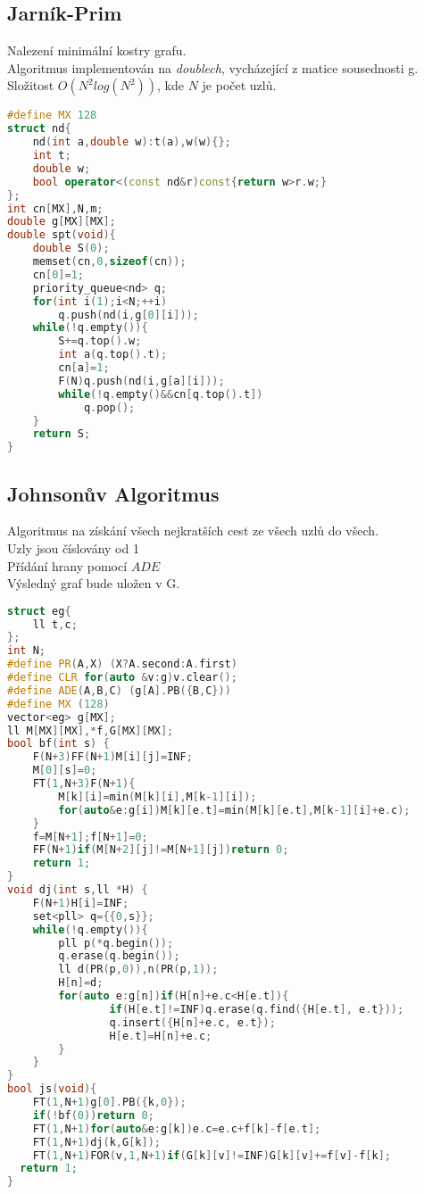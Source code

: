 \documentclass[11pt]{article}
\begin{document}
\subsection{Jarník-Prim}
Nalezení minimální kostry grafu.
\\Algoritmus implementován na \textit{doublech}, vycházející z matice sousednosti \textsf{g}.
\\Složitost $O(N^2log(N^2))$, kde $N$ je počet uzlů.
\begin{lstlisting}[language=C++]
#define MX 128
struct nd{
    nd(int a,double w):t(a),w(w){};
    int t;
    double w;
    bool operator<(const nd&r)const{return w>r.w;}
};
int cn[MX],N,m;
double g[MX][MX];
double spt(void){
    double S(0);
    memset(cn,0,sizeof(cn));
    cn[0]=1;
    priority_queue<nd> q;
    for(int i(1);i<N;++i)
        q.push(nd(i,g[0][i]));
    while(!q.empty()){
        S+=q.top().w;
        int a(q.top().t);
        cn[a]=1;
        F(N)q.push(nd(i,g[a][i]));
        while(!q.empty()&&cn[q.top().t])
            q.pop();
    }
    return S;
}
\end{lstlisting}
\subsection{Johnsonův Algoritmus}
Algoritmus na získání všech nejkratších cest ze všech uzlů do všech.
\\Uzly jsou číslovány od 1
\\Přídání hrany pomocí $ADE$
\\Výsledný graf bude uložen v \textsf{G}.
\begin{lstlisting}[language=C++]
struct eg{
    ll t,c;
};
int N;
#define PR(A,X) (X?A.second:A.first)
#define CLR for(auto &v:g)v.clear();
#define ADE(A,B,C) (g[A].PB({B,C}))
#define MX (128)
vector<eg> g[MX];
ll M[MX][MX],*f,G[MX][MX];
bool bf(int s) {
    F(N+3)FF(N+1)M[i][j]=INF;
    M[0][s]=0;
    FT(1,N+3)F(N+1){
        M[k][i]=min(M[k][i],M[k-1][i]);
        for(auto&e:g[i])M[k][e.t]=min(M[k][e.t],M[k-1][i]+e.c);
    }
    f=M[N+1];f[N+1]=0;
    FF(N+1)if(M[N+2][j]!=M[N+1][j])return 0;
    return 1;
}
void dj(int s,ll *H) {
    F(N+1)H[i]=INF;
    set<pll> q={{0,s}};
    while(!q.empty()){
        pll p(*q.begin());
        q.erase(q.begin());
        ll d(PR(p,0)),n(PR(p,1));
        H[n]=d;
        for(auto e:g[n])if(H[n]+e.c<H[e.t]){
                if(H[e.t]!=INF)q.erase(q.find({H[e.t], e.t}));
                q.insert({H[n]+e.c, e.t});
                H[e.t]=H[n]+e.c;
        }
    }
}
bool js(void){
    FT(1,N+1)g[0].PB({k,0});
    if(!bf(0))return 0;
    FT(1,N+1)for(auto&e:g[k])e.c=e.c+f[k]-f[e.t];
    FT(1,N+1)dj(k,G[k]);
    FT(1,N+1)FOR(v,1,N+1)if(G[k][v]!=INF)G[k][v]+=f[v]-f[k];
  return 1;
}
\end{lstlisting}
\end{document}
